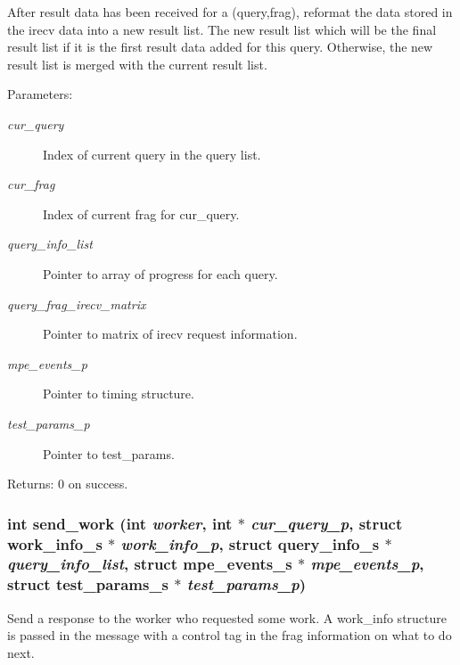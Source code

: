After result data has been received for a (query,frag), reformat the data stored in the irecv data into a new result list. The new result list which will be the final result list if it is the first result data added for this query. Otherwise, the new result list is merged with the current result list.

\begin{Desc}
\item[Parameters:]
\begin{description}
\item[{\em cur\_\-query}]Index of current query in the query list. \item[{\em cur\_\-frag}]Index of current frag for cur\_\-query. \item[{\em query\_\-info\_\-list}]Pointer to array of progress for each query. \item[{\em query\_\-frag\_\-irecv\_\-matrix}]Pointer to matrix of irecv request information. \item[{\em mpe\_\-events\_\-p}]Pointer to timing structure. \item[{\em test\_\-params\_\-p}]Pointer to test\_\-params. \end{description}
\end{Desc}
\begin{Desc}
\item[Returns:]0 on success. \end{Desc}
\subsubsection{\setlength{\rightskip}{0pt plus 5cm}int send\_\-work (int {\em worker}, int $\ast$ {\em cur\_\-query\_\-p}, struct \bf{work\_\-info\_\-s} $\ast$ {\em work\_\-info\_\-p}, struct \bf{query\_\-info\_\-s} $\ast$ {\em query\_\-info\_\-list}, struct \bf{mpe\_\-events\_\-s} $\ast$ {\em mpe\_\-events\_\-p}, struct \bf{test\_\-params\_\-s} $\ast$ {\em test\_\-params\_\-p})}\label{master__help_8c_deb96e13f94645e4c7975cc6afbd2576}


Send a response to the worker who requested some work. A work\_\-info structure is passed in the message with a control tag in the frag information on what to do next.

